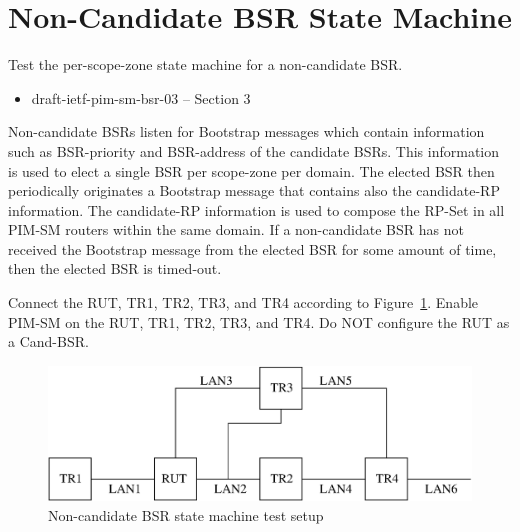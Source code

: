 \documentclass[11pt]{report}
\begin{document}
\newpage
\section{Non-Candidate BSR State Machine}

Test the per-scope-zone state machine for a non-candidate BSR.

\begin{itemize}
  \item draft-ietf-pim-sm-bsr-03 -- Section 3
\end{itemize}

Non-candidate BSRs listen for Bootstrap messages which contain information
such as BSR-priority and BSR-address of the candidate BSRs.
This information is used
to elect a single BSR per scope-zone per domain. The elected BSR then
periodically originates a Bootstrap message that contains also the
candidate-RP information. The candidate-RP information is used to compose the
RP-Set in all PIM-SM routers within the same domain. If a non-candidate BSR has
not received the Bootstrap message from the elected BSR for some amount of
time, then the elected BSR is timed-out.

Connect the RUT, TR1, TR2, TR3, and TR4 according to
Figure~\ref{fig:pim_test_6_2_non_candidate_bsr_state_machine}.
Enable PIM-SM on the RUT, TR1, TR2, TR3, and TR4. Do NOT configure the RUT as
a Cand-BSR.

\begin{figure}[htbp]
  \begin{center}
    \includegraphics[scale=0.8]{figs/pim_test_6_2_non_candidate_bsr_state_machine}
    \caption{Non-candidate BSR state machine test setup}
    \label{fig:pim_test_6_2_non_candidate_bsr_state_machine}
  \end{center}
\end{figure}


\end{document}
